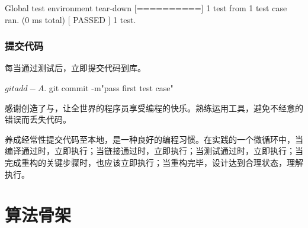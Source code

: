 \begin{content}
\begin{leftbar}
\begin{c++}[caption={\ttfamily{运行测试}}]
[----------] Global test environment tear-down
[==========] 1 test from 1 test case ran. (0 ms total)
[  PASSED  ] 1 test.
 \end{c++}
\end{leftbar}

\subsubsection{提交代码}

每当通过测试后，立即提交代码到库。

\begin{leftbar}
 \begin{c++}[caption={\ttfamily{提交代码}}]
$ git add -A .
$ git commit -m"pass first test case"
 \end{c++}
\end{leftbar}

\begin{story}
  \begin{center}
  \end{center}

\begin{content}

感谢创造了与，让全世界的程序员享受编程的快乐。熟练运用工具，避免不经意的错误而丢失代码。

养成经常性提交代码至本地，是一种良好的编程习惯。在实践的一个微循环中，当编译通过时，立即执行；当链接通过时，立即执行；当测试通过时，立即执行；当完成重构的关键步骤时，也应该立即执行；当重构完毕，设计达到合理状态，理解执行。



\end{content}

\end{story}

\end{content}

\section{算法骨架}


